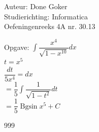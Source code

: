 \documentclass[a4paper]{article}
\begin{document}
  
\noindent \large Auteur: Done Goker \\
\noindent \large Studierichting: Informatica\\
\noindent \large Oefeningenreeks 4A nr. 30.13\\

\medskip

\normalsize

Opgave:
$\displaystyle\int \dfrac{x^4}{\sqrt{1-x^{10}}} dx$ \\

$t = x^5$ \\

$ \dfrac{dt}{5x^4}  = dx$ \\

$= \dfrac{1}{5}\displaystyle\int \dfrac{1}{\sqrt{1-t^{2}}}dt $ \\

$=\dfrac{1}{5} \operatorname{Bgsin} x^5 + C$

\begin{thebibliography}{999}
\end{thebibliography}
\end{document}
